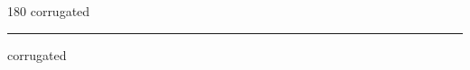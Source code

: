 
\begin{frame}
\begin{center}
\begin{turn}{180}
{\fontsize{2.5cm}{1em}\selectfont corrugated}
\end{turn}
\vspace{1em}\par  
\hrule
\vspace{1em}\par  
{\fontsize{2.5cm}{1em}\selectfont corrugated}
\end{center}
\end{frame}
